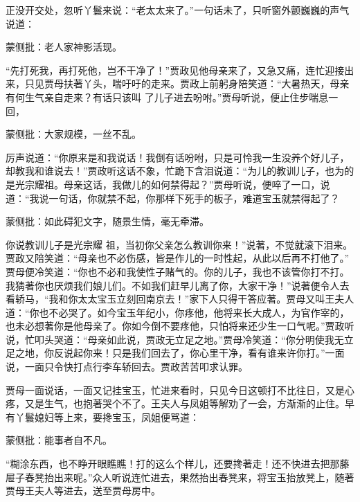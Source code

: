 \begin{parag}


    正没开交处，忽听丫鬟来说：“老太太来了。”一句话未了，只听窗外颤巍巍的声气说道：\begin{note}蒙侧批：老人家神影活现。\end{note}“先打死我，再打死他，岂不干净了！”贾政见他母亲来了，又急又痛，连忙迎接出来，只见贾母扶著丫头，喘吁吁的走来。贾政上前躬身陪笑道：“大暑热天，母亲有何生气亲自走来？有话只该叫 了儿子进去吩咐。”贾母听说，便止住步喘息一回，\begin{note}蒙侧批：大家规模，一丝不乱。\end{note}厉声说道：“你原来是和我说话！我倒有话吩咐，只是可怜我一生没养个好儿子，却教我和谁说去！”贾政听这话不象，忙跪下含泪说道：“为儿的教训儿子，也为的是光宗耀祖。母亲这话，我做儿的如何禁得起？”贾母听说，便啐了一口，说道：“我说一句话，你就禁不起，你那样下死手的板子，难道宝玉就禁得起了？\begin{note}蒙侧批：如此碍犯文字，随景生情，毫无牵滞。\end{note}你说教训儿子是光宗耀 祖，当初你父亲怎么教训你来！”说著，不觉就滚下泪来。贾政又陪笑道：“母亲也不必伤感，皆是作儿的一时性起，从此以后再不打他了。” 贾母便冷笑道：“你也不必和我使性子赌气的。你的儿子，我也不该管你打不打。我猜著你也厌烦我们娘儿们。不如我们赶早儿离了你，大家干净！”说著便令人去看轿马，“我和你太太宝玉立刻回南京去！”家下人只得干答应著。贾母又叫王夫人道：“你也不必哭了。如今宝玉年纪小，你疼他，他将来长大成人，为官作宰的，也未必想著你是他母亲了。你如今倒不要疼他，只怕将来还少生一口气呢。”贾政听说，忙叩头哭道：“母亲如此说，贾政无立足之地。”贾母冷笑道：“你分明使我无立足之地，你反说起你来！只是我们回去了，你心里干净，看有谁来许你打。”一面说，一面只令快打点行李车轿回去。贾政苦苦叩求认罪。
\end{parag}


\begin{parag}


    贾母一面说话，一面又记挂宝玉，忙进来看时，只见今日这顿打不比往日，又是心疼，又是生气，也抱著哭个不了。王夫人与凤姐等解劝了一会，方渐渐的止住。早有丫鬟媳妇等上来，要搀宝玉，凤姐便骂道：\begin{note}蒙侧批：能事者自不凡。\end{note}“糊涂东西，也不睁开眼瞧瞧！打的这么个样儿，还要搀著走！还不快进去把那藤 屉子春凳抬出来呢。”众人听说连忙进去，果然抬出春凳来，将宝玉抬放凳上，随著贾母王夫人等进去，送至贾母房中。
\end{parag}


